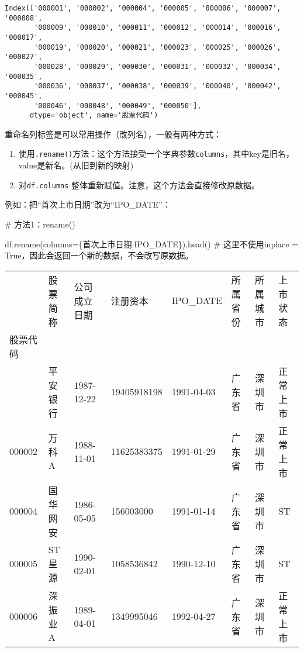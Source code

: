 \documentclass[
  letterpaper,
  DIV=11,
  numbers=noendperiod]{scrreprt}
\newenvironment{Shaded}{\begin{snugshade}}{\end{snugshade}}
\newcommand{\CommentTok}[1]{\textcolor[rgb]{0.37,0.37,0.37}{#1}}
\newcommand{\NormalTok}[1]{\textcolor[rgb]{0.00,0.23,0.31}{#1}}
\newcommand{\OperatorTok}[1]{\textcolor[rgb]{0.37,0.37,0.37}{#1}}
\newcommand{\StringTok}[1]{\textcolor[rgb]{0.13,0.47,0.30}{#1}}
\providecommand{\tightlist}{%
  \setlength{\itemsep}{0pt}\setlength{\parskip}{0pt}}\usepackage{longtable,booktabs,array}
\begin{document}
\begin{verbatim}
Index(['000001', '000002', '000004', '000005', '000006', '000007', '000008',
       '000009', '000010', '000011', '000012', '000014', '000016', '000017',
       '000019', '000020', '000021', '000023', '000025', '000026', '000027',
       '000028', '000029', '000030', '000031', '000032', '000034', '000035',
       '000036', '000037', '000038', '000039', '000040', '000042', '000045',
       '000046', '000048', '000049', '000050'],
      dtype='object', name='股票代码')
\end{verbatim}

重命名列标签是可以常用操作（改列名），一般有两种方式：

\begin{enumerate}
\def\labelenumi{\arabic{enumi}.}
\tightlist
\item
  使用\texttt{.rename()}方法：这个方法接受一个字典参数\texttt{columns}，其中key是旧名，value是新名。(从旧到新的映射)
\item
  对\texttt{df.columns} 整体重新赋值。注意，这个方法会直接修改原数据。
\end{enumerate}

例如：把``首次上市日期''改为``IPO\_DATE''：

\begin{Shaded}
\begin{Highlighting}[]
\CommentTok{\# 方法1：rename()}

\NormalTok{df.rename(columns}\OperatorTok{=}\NormalTok{\{}\StringTok{\textquotesingle{}首次上市日期\textquotesingle{}}\NormalTok{:}\StringTok{\textquotesingle{}IPO\_DATE\textquotesingle{}}\NormalTok{\}).head()}
\CommentTok{\# 这里不使用inplace = True，因此会返回一个新的数据，不会改写原数据。}
\end{Highlighting}
\end{Shaded}

\begin{longtable}[]{@{}llllllll@{}}
\toprule\noalign{}
& 股票简称 & 公司成立日期 & 注册资本 & IPO\_DATE & 所属省份 & 所属城市 &
上市状态 \\
股票代码 & & & & & & & \\
\midrule\noalign{}
\endhead
\bottomrule\noalign{}
\endlastfoot
000001 & 平安银行 & 1987-12-22 & 19405918198 & 1991-04-03 & 广东省 &
深圳市 & 正常上市 \\
000002 & 万科A & 1988-11-01 & 11625383375 & 1991-01-29 & 广东省 & 深圳市
& 正常上市 \\
000004 & 国华网安 & 1986-05-05 & 156003000 & 1991-01-14 & 广东省 &
深圳市 & ST \\
000005 & ST 星源 & 1990-02-01 & 1058536842 & 1990-12-10 & 广东省 &
深圳市 & ST \\
000006 & 深振业A & 1989-04-01 & 1349995046 & 1992-04-27 & 广东省 &
深圳市 & 正常上市 \\
\end{longtable}
\end{document}
